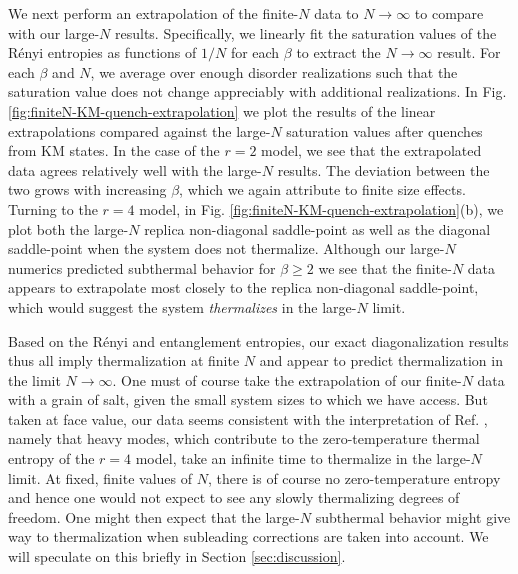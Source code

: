\documentclass[reprint, floatfix,eqsecnum,superscriptaddress,preprint,nofootinbib,onecolumn,amsmath,amssymb,aps,prb]{revtex4-2}
\begin{document}
We next perform an extrapolation of the finite-$N$ data to $N \to \infty$ to compare with our large-$N$ results. Specifically, we linearly fit the saturation values of the R\'enyi entropies as functions of $1/N$ for each $\beta$ to extract the $N \to \infty$ result. For each $\beta$ and $N$, we average over enough disorder realizations such that the saturation value does not change appreciably with additional realizations. In Fig. \ref{fig:finiteN-KM-quench-extrapolation} 
we plot the results of the linear extrapolations compared against the large-$N$ saturation values after quenches from KM states. 
In the case of the $r=2$ model, we see that the extrapolated data agrees relatively well with the large-$N$ results. The deviation between the two grows with increasing $\beta$, which we again attribute to finite size effects.
Turning to the $r=4$ model,
in Fig. \ref{fig:finiteN-KM-quench-extrapolation}(b), we plot both the large-$N$ replica non-diagonal saddle-point as well as the diagonal saddle-point when the system does not thermalize.  %
Although our large-$N$ numerics predicted subthermal behavior for $\beta \geq 2$ we see that the finite-$N$ data appears to extrapolate most closely to the replica non-diagonal saddle-point, which would suggest the system \emph{thermalizes} in the large-$N$ limit.

Based on the R\'enyi and entanglement entropies, our exact diagonalization results thus all imply thermalization at finite  $N$ and appear to predict thermalization in the limit $N \to \infty$. %
One must of course take the extrapolation of our finite-$N$ data with a grain of salt, given the small system sizes to which we have access. But taken at face value, our data seems consistent with the interpretation of Ref. \cite{Gu2017b}, namely that heavy modes, which contribute to the zero-temperature thermal entropy of the $r=4$ model, take an infinite time to thermalize in the large-$N$ limit. At fixed, finite values of $N$, there is of course no zero-temperature entropy and hence one would not expect to see any slowly thermalizing degrees of freedom. One might then expect that the large-$N$ subthermal behavior might give way to thermalization when %
subleading corrections are taken into account. We will speculate on this briefly in Section \ref{sec:discussion}.  
\end{document}

